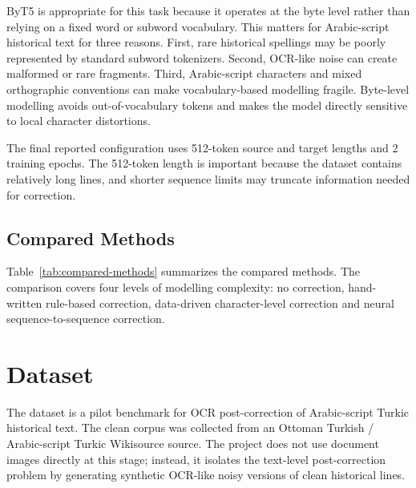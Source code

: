 \documentclass{article}
\begin{document}
ByT5 is appropriate for this task because it operates at the byte level rather than relying on a fixed word or subword vocabulary. This matters for Arabic-script historical text for three reasons. First, rare historical spellings may be poorly represented by standard subword tokenizers. Second, OCR-like noise can create malformed or rare fragments. Third, Arabic-script characters and mixed orthographic conventions can make vocabulary-based modelling fragile. Byte-level modelling avoids out-of-vocabulary tokens and makes the model directly sensitive to local character distortions.

The final reported configuration uses 512-token source and target lengths and 2 training epochs. The 512-token length is important because the dataset contains relatively long lines, and shorter sequence limits may truncate information needed for correction.

\begin{table}[tbh!]
\begin{center}

\caption{Final ByT5-small configuration used in the reported experiment.}
\label{tab:byt5-hyperparams}
\end{center}
\end{table}

\subsection{Compared Methods}

Table~\ref{tab:compared-methods} summarizes the compared methods. The comparison covers four levels of modelling complexity: no correction, hand-written rule-based correction, data-driven character-level correction and neural sequence-to-sequence correction.

\begin{table}[tbh!]
\begin{center}
\small

\caption{Compared OCR post-correction methods.}
\label{tab:compared-methods}
\end{center}
\end{table}


\section{Dataset}

The dataset is a pilot benchmark for OCR post-correction of Arabic-script Turkic historical text. The clean corpus was collected from an Ottoman Turkish / Arabic-script Turkic Wikisource source. The project does not use document images directly at this stage; instead, it isolates the text-level post-correction problem by generating synthetic OCR-like noisy versions of clean historical lines.
\end{document}

